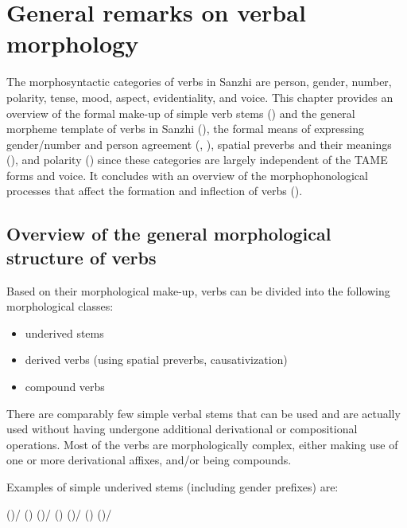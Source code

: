 \chapter{General remarks on verbal morphology}
\label{cpt:verbs}

The morphosyntactic categories of verbs in Sanzhi are person, gender, number, polarity, tense, mood, aspect, evidentiality, and voice. This chapter provides an overview of the formal make-up of simple verb stems () and the general morpheme template of verbs in Sanzhi (), the formal means of expressing gender/number and person agreement (, ), spatial preverbs and their meanings (), and polarity () since these categories are largely independent of the TAME forms and voice. It concludes with an overview of the morphophonological processes that affect the formation and inflection of verbs ().



\section{Overview of the general morphological structure of verbs}
\label{sec:Overview about the general morphological structure of verbs}

Based on their morphological make-up, verbs can be divided into the following morphological classes:
%
\begin{itemize}
	\item	underived stems
	\item	derived verbs (using spatial preverbs, causativization)
	\item	compound verbs
\end{itemize}

There are comparably few simple verbal stems that can be used and are actually used without having undergone additional derivational or compositional operations. Most of the verbs are morphologically complex, either making use of one or more derivational affixes, and/or being compounds.

Examples of simple underived stems (including gender prefixes) are:
%
\begin{exe}
	\ex	\label{ex:underived verbs verbs}
	\begin{xlist}
		\ex	 {} ()\slash{} () 
		\ex	{} ()\slash{} () 
		\ex	{} 
		\ex	{} ()\slash{} () 
		\ex	{} ()\slash{} 
	\end{xlist}
\end{exe}

